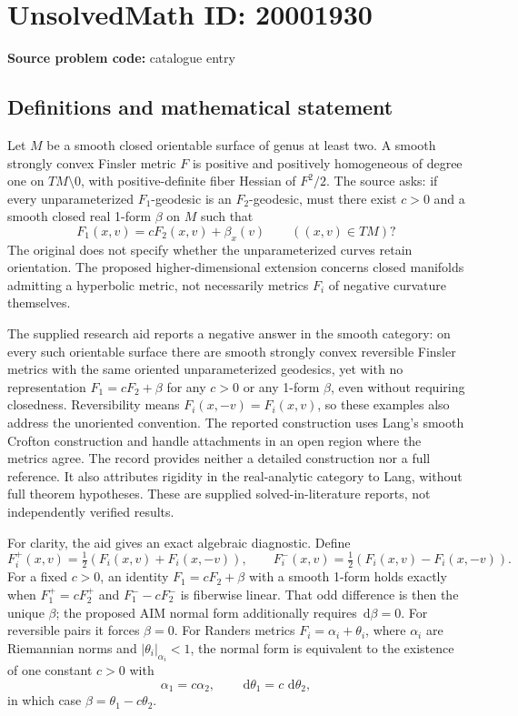 \documentclass[11pt]{article}
\newcommand{\dd}{\,\mathrm{d}}
\begin{document}
\section*{UnsolvedMath ID: 20001930}
\textbf{Source problem code:} catalogue entry
\subsection{Definitions and mathematical statement}
Let \(M\) be a smooth closed orientable surface of genus at least two. A smooth strongly convex Finsler metric \(F\) is positive and positively homogeneous of degree one on \(TM\setminus0\), with positive-definite fiber Hessian of \(F^2/2\). The source asks: if every unparameterized \(F_1\)-geodesic is an \(F_2\)-geodesic, must there exist \(c>0\) and a smooth closed real 1-form \(\beta\) on \(M\) such that
\[
F_1(x,v)=cF_2(x,v)+\beta_x(v)\qquad((x,v)\in TM)?
\]
The original does not specify whether the unparameterized curves retain orientation. The proposed higher-dimensional extension concerns closed manifolds admitting a hyperbolic metric, not necessarily metrics \(F_i\) of negative curvature themselves.

The supplied research aid reports a negative answer in the smooth category: on every such orientable surface there are smooth strongly convex reversible Finsler metrics with the same oriented unparameterized geodesics, yet with no representation \(F_1=cF_2+\beta\) for any \(c>0\) or any 1-form \(\beta\), even without requiring closedness. Reversibility means \(F_i(x,-v)=F_i(x,v)\), so these examples also address the unoriented convention. The reported construction uses Lang's smooth Crofton construction and handle attachments in an open region where the metrics agree. The record provides neither a detailed construction nor a full reference. It also attributes rigidity in the real-analytic category to Lang, without full theorem hypotheses. These are supplied solved-in-literature reports, not independently verified results.

For clarity, the aid gives an exact algebraic diagnostic. Define
\[
F_i^+(x,v)=\tfrac12(F_i(x,v)+F_i(x,-v)),\qquad
F_i^-(x,v)=\tfrac12(F_i(x,v)-F_i(x,-v)).
\]
For a fixed \(c>0\), an identity \(F_1=cF_2+\beta\) with a smooth 1-form holds exactly when \(F_1^+=cF_2^+\) and \(F_1^--cF_2^-\) is fiberwise linear. That odd difference is then the unique \(\beta\); the proposed AIM normal form additionally requires \(\dd\beta=0\). For reversible pairs it forces \(\beta=0\). For Randers metrics \(F_i=\alpha_i+\theta_i\), where \(\alpha_i\) are Riemannian norms and \(|\theta_i|_{\alpha_i}<1\), the normal form is equivalent to the existence of one constant \(c>0\) with
\[
\alpha_1=c\alpha_2,\qquad \dd\theta_1=c\,\dd\theta_2,
\]
in which case \(\beta=\theta_1-c\theta_2\).
\end{document}
